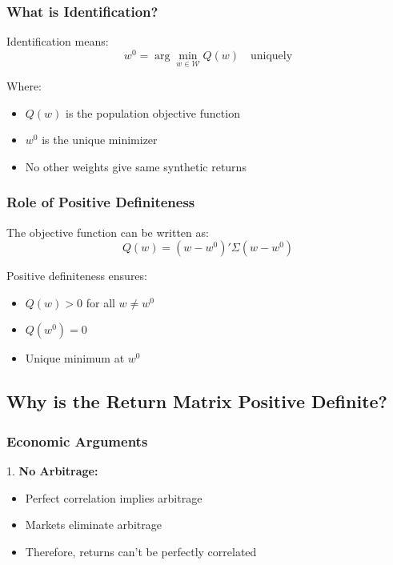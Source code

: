 \documentclass[12pt,article]{memoir}
\begin{document}
\subsubsection{What is Identification?}

Identification means:
\begin{equation}
    w^0 = \arg\min_{w \in \mathcal{W}} Q(w) \quad \text{uniquely}
\end{equation}

Where:
\begin{itemize}
    \item $Q(w)$ is the population objective function
    \item $w^0$ is the unique minimizer
    \item No other weights give same synthetic returns
\end{itemize}

\subsubsection{Role of Positive Definiteness}

The objective function can be written as:
\begin{equation}
    Q(w) = (w - w^0)'\Sigma(w - w^0)
\end{equation}

Positive definiteness ensures:
\begin{itemize}
    \item $Q(w) > 0$ for all $w \neq w^0$
    \item $Q(w^0) = 0$
    \item Unique minimum at $w^0$
\end{itemize}

\subsection{Why is the Return Matrix Positive Definite?}

\subsubsection{Economic Arguments}

1. \textbf{No Arbitrage:}
\begin{itemize}
    \item Perfect correlation implies arbitrage
    \item Markets eliminate arbitrage
    \item Therefore, returns can't be perfectly correlated
\end{itemize}
\end{document}
